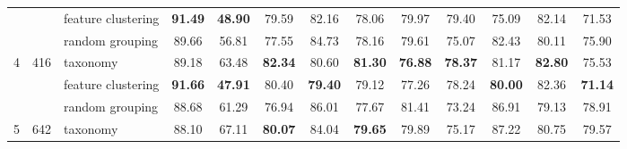 \documentclass[final]{cvpr}
\begin{document}
\begin{table*}[t]
{\begin{tabular}{c|c|l|cc|cc|cc|cc|cc}
                                &                                                                                        & feature clustering                                                                                          & \textbf{91.49}       & \textbf{48.90}        & 79.59                & 82.16                 & 78.06                & 79.97                 & 79.40                & 75.09                 & 82.14                & 71.53                \\
                                &                                                                                        & random grouping                                                                                             & 89.66                & 56.81                 & 77.55                & 84.73                 & 78.16                & 79.61                 & 75.07                & 82.43                 & 80.11                & 75.90                \\ \midrule
\multirow{3}{*}{4}              & \multirow{3}{*}{416}                                                                   & taxonomy                                                                                                    & 89.18                & 63.48                 & \textbf{82.34}       & 80.60                 & \textbf{81.30}       & \textbf{76.88}        & \textbf{78.37}       & 81.17                 & \textbf{82.80}       & 75.53                \\
                                &                                                                                        & feature clustering                                                                                          & \textbf{91.66}       & \textbf{47.91}        & 80.40                & \textbf{79.40}        & 79.12                & 77.26                 & 78.24                & \textbf{80.00}        & 82.36                & \textbf{71.14}       \\
                                &                                                                                        & random grouping                                                                                             & 88.68                & 61.29                 & 76.94                & 86.01                 & 77.67                & 81.41                 & 73.24                & 86.91                 & 79.13                & 78.91                \\ \midrule
\multirow{3}{*}{5}              & \multirow{3}{*}{642}                                                                   & taxonomy                                                                                                    & 88.10                & 67.11                 & \textbf{80.07}       & 84.04                 & \textbf{79.65}       & 79.89                 & 75.17                & 87.22                 & 80.75                & 79.57                \\

\end{tabular}}
\end{table*}
\end{document}
